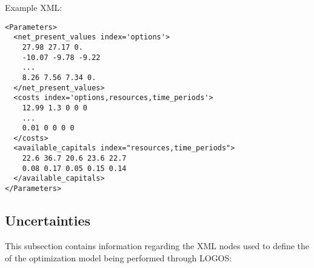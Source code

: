 Example XML:
\begin{lstlisting}[style=XML]
<Parameters>
  <net_present_values index='options'>
    27.98 27.17 0.
    -10.07 -9.78 -9.22
    ...
    8.26 7.56 7.34 0.
  </net_present_values>
  <costs index='options,resources,time_periods'>
    12.99 1.3 0 0 0
    ...
    0.01 0 0 0 0
  </costs>
  <available_capitals index="resources,time_periods">
    22.6 36.7 20.6 23.6 22.7
    0.08 0.17 0.05 0.15 0.14
  </available_capitals>
</Parameters>
\end{lstlisting}


%
\subsection{Uncertainties}
\label{subsec:Uncertainties}
This subsection contains information regarding the XML nodes used to define the
 of the optimization model being performed through LOGOS:
